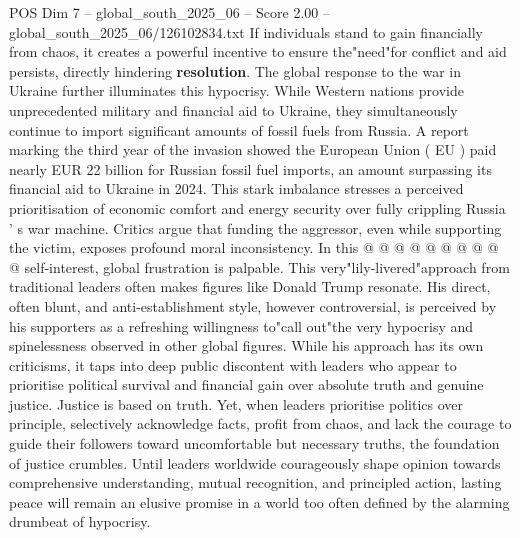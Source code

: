 \begin{textsample}{POS Dim 7 – global\_south\_2025\_06 – Score 2.00 – global\_south\_2025\_06/126102834.txt}
If individuals stand to gain financially from chaos, it creates a powerful incentive to ensure the"need"for conflict and aid persists, directly hindering \textbf{resolution}.
The global response to the war in Ukraine further illuminates this hypocrisy.
While Western nations provide unprecedented military and financial aid to Ukraine, they simultaneously continue to import significant amounts of fossil fuels from Russia.
A report marking the third year of the invasion showed the European Union ( EU ) paid nearly EUR 22 billion for Russian fossil fuel imports, an amount surpassing its financial aid to Ukraine in 2024.
This stark imbalance stresses a perceived prioritisation of economic comfort and energy security over fully crippling Russia ' s war machine.
Critics argue that funding the aggressor, even while supporting the victim, exposes profound moral inconsistency.
In this @ @ @ @ @ @ @ @ @ @ self-interest, global frustration is palpable.
This very"lily-livered"approach from traditional leaders often makes figures like Donald Trump resonate.
His direct, often blunt, and anti-establishment style, however controversial, is perceived by his supporters as a refreshing willingness to"call out"the very hypocrisy and spinelessness observed in other global figures.
While his approach has its own criticisms, it taps into deep public discontent with leaders who appear to prioritise political survival and financial gain over absolute truth and genuine justice.
Justice is based on truth.
Yet, when leaders prioritise politics over principle, selectively acknowledge facts, profit from chaos, and lack the courage to guide their followers toward uncomfortable but necessary truths, the foundation of justice crumbles.
Until leaders worldwide courageously shape opinion towards comprehensive understanding, mutual recognition, and principled action, lasting peace will remain an elusive promise in a world too often defined by the alarming drumbeat of hypocrisy.

\end{textsample}
